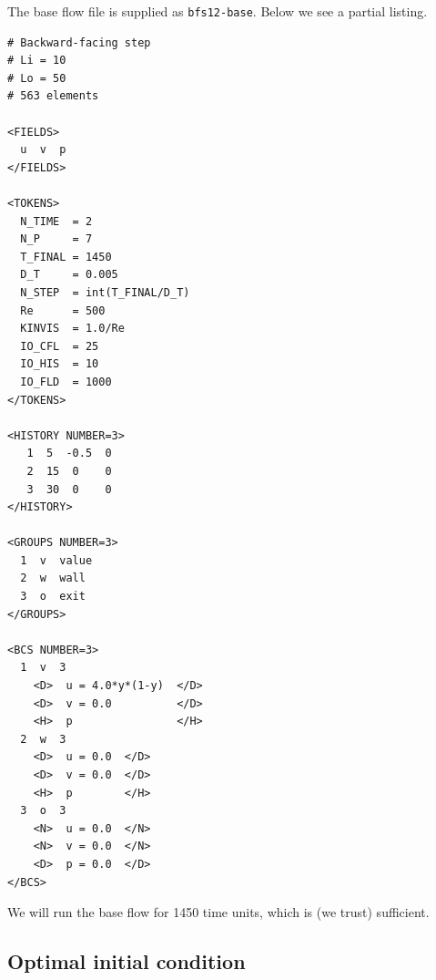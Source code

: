 \documentclass[11pt,a4paper]{report}
\begin{document}
The base flow file is supplied as \verb+bfs12-base+. Below we see a
partial listing.
{\small
\begin{verbatim}
# Backward-facing step
# Li = 10
# Lo = 50
# 563 elements

<FIELDS>
  u  v  p
</FIELDS>

<TOKENS>
  N_TIME  = 2
  N_P     = 7
  T_FINAL = 1450
  D_T     = 0.005
  N_STEP  = int(T_FINAL/D_T)
  Re      = 500
  KINVIS  = 1.0/Re
  IO_CFL  = 25
  IO_HIS  = 10
  IO_FLD  = 1000
</TOKENS>

<HISTORY NUMBER=3>
   1  5	 -0.5  0
   2  15  0    0
   3  30  0    0
</HISTORY>

<GROUPS NUMBER=3>
  1  v  value
  2  w  wall
  3  o  exit
</GROUPS>

<BCS NUMBER=3>
  1  v  3
    <D>  u = 4.0*y*(1-y)  </D>
    <D>  v = 0.0          </D>
    <H>  p                </H>
  2  w  3
    <D>  u = 0.0  </D>
    <D>  v = 0.0  </D>
    <H>  p        </H>
  3  o  3
    <N>  u = 0.0  </N>
    <N>  v = 0.0  </N>
    <D>  p = 0.0  </D>
</BCS>
\end{verbatim}
}
\noindent We will run the base flow for 1450 time units, which is (we
trust) sufficient.

\subsection{Optimal initial condition}
\end{document}
